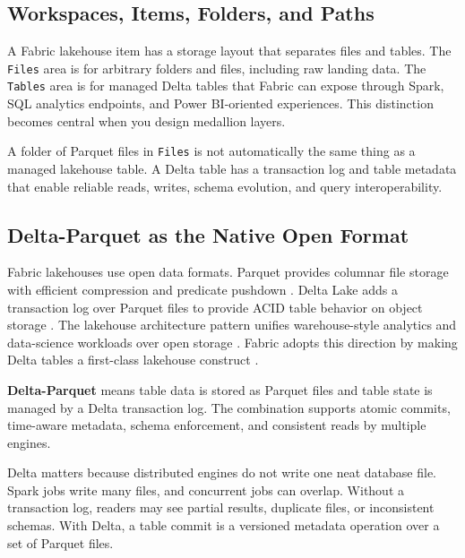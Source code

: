 \subsection{Workspaces, Items, Folders, and Paths}
A Fabric lakehouse item has a storage layout that separates files and tables. The \texttt{Files} area is for arbitrary folders and files, including raw landing data. The \texttt{Tables} area is for managed Delta tables that Fabric can expose through Spark, SQL analytics endpoints, and Power BI-oriented experiences. This distinction becomes central when you design medallion layers.

\begin{notebox}
A folder of Parquet files in \texttt{Files} is not automatically the same thing as a managed lakehouse table. A Delta table has a transaction log and table metadata that enable reliable reads, writes, schema evolution, and query interoperability.
\end{notebox}

\subsection{Delta-Parquet as the Native Open Format}
Fabric lakehouses use open data formats. Parquet provides columnar file storage with efficient compression and predicate pushdown \cite{apacheParquet}. Delta Lake adds a transaction log over Parquet files to provide ACID table behavior on object storage \cite{armbrust2020delta,deltaLakeDocs}. The lakehouse architecture pattern unifies warehouse-style analytics and data-science workloads over open storage \cite{armbrust2021lakehouse}. Fabric adopts this direction by making Delta tables a first-class lakehouse construct \cite{microsoftFabricLakehouse}.

\begin{definitionbox}
\textbf{Delta-Parquet} means table data is stored as Parquet files and table state is managed by a Delta transaction log. The combination supports atomic commits, time-aware metadata, schema enforcement, and consistent reads by multiple engines.
\end{definitionbox}

Delta matters because distributed engines do not write one neat database file. Spark jobs write many files, and concurrent jobs can overlap. Without a transaction log, readers may see partial results, duplicate files, or inconsistent schemas. With Delta, a table commit is a versioned metadata operation over a set of Parquet files.

